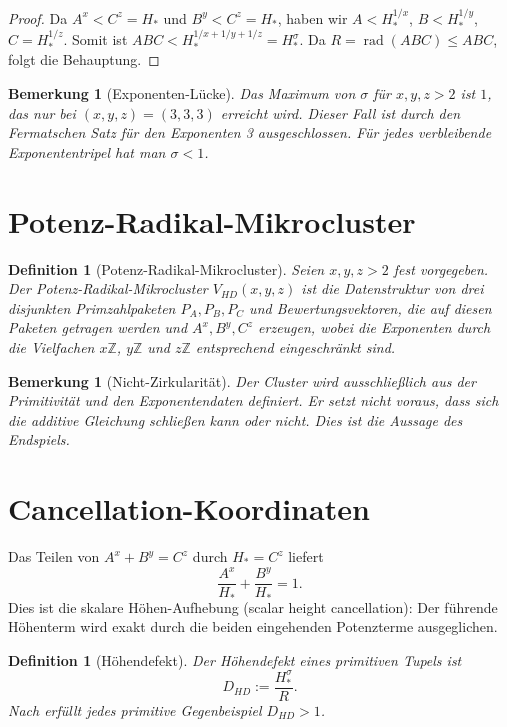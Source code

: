 \documentclass[11pt,a4paper]{article}
\DeclareMathOperator{\rad}{rad}
\newtheorem{definition}[theorem]{Definition}
\newtheorem{remark}[theorem]{Bemerkung}
\begin{document}
\begin{proof}
Da $A^x < C^z=H_*$ und $B^y < C^z=H_*$, haben wir $A < H_*^{1/x}$, $B < H_*^{1/y}$, $C=H_*^{1/z}$. Somit ist $ABC < H_*^{1/x+1/y+1/z}=H_*^{\sigma}$. Da $R=\rad(ABC)\le ABC$, folgt die Behauptung.
\end{proof}

\begin{remark}[Exponenten-Lücke]
Das Maximum von $\sigma$ für $x,y,z>2$ ist $1$, das nur bei $(x,y,z)=(3,3,3)$ erreicht wird. Dieser Fall ist durch den Fermatschen Satz für den Exponenten 3 ausgeschlossen. Für jedes verbleibende Exponententripel hat man $\sigma<1$.
\end{remark}

\section{Potenz-Radikal-Mikrocluster}

\begin{definition}[Potenz-Radikal-Mikrocluster]
Seien $x,y,z>2$ fest vorgegeben. Der Potenz-Radikal-Mikrocluster $V_{HD}(x,y,z)$ ist die Datenstruktur von drei disjunkten Primzahlpaketen $P_A, P_B, P_C$ und Bewertungsvektoren, die auf diesen Paketen getragen werden und $A^x, B^y, C^z$ erzeugen, wobei die Exponenten durch die Vielfachen $x\mathbb Z$, $y\mathbb Z$ und $z\mathbb Z$ entsprechend eingeschränkt sind.
\end{definition}

\begin{remark}[Nicht-Zirkularität]
Der Cluster wird ausschließlich aus der Primitivität und den Exponentendaten definiert. Er setzt nicht voraus, dass sich die additive Gleichung schließen kann oder nicht. Dies ist die Aussage des Endspiels.
\end{remark}

\section{Cancellation-Koordinaten}

Das Teilen von $A^x+B^y=C^z$ durch $H_*=C^z$ liefert
\[
  \frac{A^x}{H_*}+\frac{B^y}{H_*}=1.
\]
Dies ist die skalare Höhen-Aufhebung (scalar height cancellation): Der führende Höhenterm wird exakt durch die beiden eingehenden Potenzterme ausgeglichen.

\begin{definition}[Höhendefekt]
Der Höhendefekt eines primitiven Tupels ist
\[
  D_{HD} := \frac{H_*^{\sigma}}{R}.
\]
Nach  erfüllt jedes primitive Gegenbeispiel $D_{HD}>1$.
\end{definition}
\end{document}
